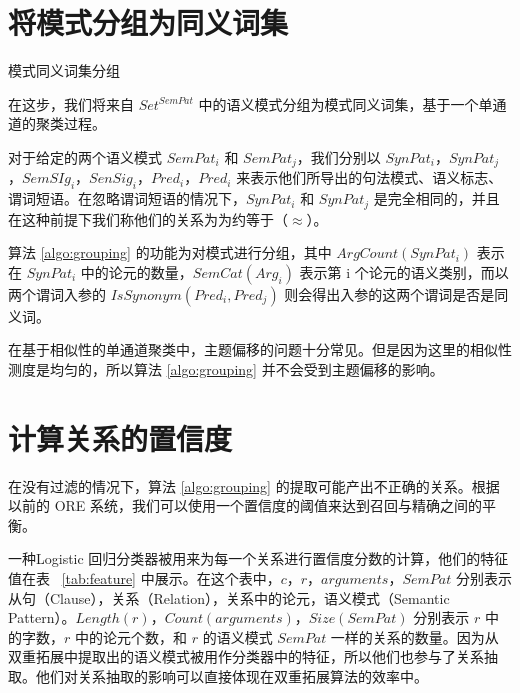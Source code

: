 \section{将模式分组为同义词集}

\begin{algorithm}[!h]
\SetAlgoLined
{}
\caption[模式同义词集分组]{模式同义词集分组}
\label{algo:grouping}
\end{algorithm}

在这步，我们将来自 $Set^{SemPat}$ 中的语义模式分组为模式同义词集，基于一个单通道的聚类过程\citep{papka1998}。

对于给定的两个语义模式 $SemPat_i$ 和 $SemPat_j$，我们分别以 $SynPat_i$，$SynPat_j$，$SemSIg_i$，$SenSig_i$，$Pred_i$，$Pred_i$ 来表示他们所导出的句法模式、语义标志、谓词短语。在忽略谓词短语的情况下，$SynPat_i$  和 $SynPat_j$ 是完全相同的，并且在这种前提下我们称他们的关系为为约等于（$ \approx$）。

算法 \ref{algo:grouping} 的功能为对模式进行分组，其中 $ArgCount(SynPat_i)$ 表示在 $SynPat_i$ 中的论元的数量，$SemCat(Arg_i)$ 表示第 i 个论元的语义类别，而以两个谓词入参的 $IsSynonym(Pred_i, Pred_j)$ 则会得出入参的这两个谓词是否是同义词。

在基于相似性的单通道聚类中，主题偏移的问题十分常见\citep{papka1998}。但是因为这里的相似性测度是均匀的，所以算法 \ref{algo:grouping} 并不会受到主题偏移的影响。

\section{计算关系的置信度}
在没有过滤的情况下，算法 \ref{algo:grouping} 的提取可能产出不正确的关系。根据以前的 ORE 系统，我们可以使用一个置信度的阈值来达到召回与精确之间的平衡。

一种Logistic 回归分类器被用来为每一个关系进行置信度分数的计算，他们的特征值在表 ~\ref{tab:feature} 中展示。在这个表中，$c$，$r$，$arguments$，$SemPat$ 分别表示从句（Clause），关系（Relation），关系中的论元，语义模式（Semantic Pattern）。$Length(r)$，$Count(arguments)$，$Size(SemPat)$ 分别表示 $r$ 中的字数，$r$ 中的论元个数，和 $r$ 的语义模式 $SemPat$ 一样的关系的数量。因为从双重拓展中提取出的语义模式被用作分类器中的特征，所以他们也参与了关系抽取。他们对关系抽取的影响可以直接体现在双重拓展算法的效率中。

